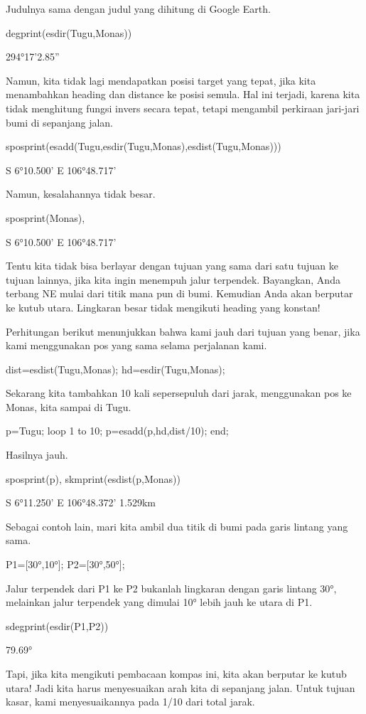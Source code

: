 \documentclass{article}
\begin{document}
Judulnya sama dengan judul yang dihitung di Google Earth.


\>degprint(esdir(Tugu,Monas))


    294°17'2.85''

Namun, kita tidak lagi mendapatkan posisi target yang tepat, jika kita
menambahkan heading dan distance ke posisi semula. Hal ini terjadi,
karena kita tidak menghitung fungsi invers secara tepat, tetapi
mengambil perkiraan jari-jari bumi di sepanjang jalan.


\>sposprint(esadd(Tugu,esdir(Tugu,Monas),esdist(Tugu,Monas)))


    S 6°10.500' E 106°48.717'

Namun, kesalahannya tidak besar.


\>sposprint(Monas),


    S 6°10.500' E 106°48.717'

Tentu kita tidak bisa berlayar dengan tujuan yang sama dari satu
tujuan ke tujuan lainnya, jika kita ingin menempuh jalur terpendek.
Bayangkan, Anda terbang NE mulai dari titik mana pun di bumi. Kemudian
Anda akan berputar ke kutub utara. Lingkaran besar tidak mengikuti
heading yang konstan!


Perhitungan berikut menunjukkan bahwa kami jauh dari tujuan yang
benar, jika kami menggunakan pos yang sama selama perjalanan kami.


\>dist=esdist(Tugu,Monas); hd=esdir(Tugu,Monas);


Sekarang kita tambahkan 10 kali sepersepuluh dari jarak, menggunakan
pos ke Monas, kita sampai di Tugu.


\>p=Tugu; loop 1 to 10; p=esadd(p,hd,dist/10); end;


Hasilnya jauh.


\>sposprint(p), skmprint(esdist(p,Monas))


    S 6°11.250' E 106°48.372'
         1.529km

Sebagai contoh lain, mari kita ambil dua titik di bumi pada garis
lintang yang sama.


\>P1=[30°,10°]; P2=[30°,50°];


Jalur terpendek dari P1 ke P2 bukanlah lingkaran dengan garis lintang
30°, melainkan jalur terpendek yang dimulai 10° lebih jauh ke utara di
P1.


\>sdegprint(esdir(P1,P2))


         79.69°

Tapi, jika kita mengikuti pembacaan kompas ini, kita akan berputar ke
kutub utara! Jadi kita harus menyesuaikan arah kita di sepanjang
jalan. Untuk tujuan kasar, kami menyesuaikannya pada 1/10 dari total
jarak.
\end{document}
